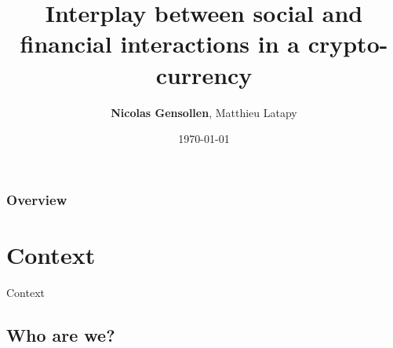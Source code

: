 \documentclass{beamer}
\title[social and financial interactions]{Interplay between social and financial interactions in a crypto-currency } %
\author{\textbf{Nicolas Gensollen}, Matthieu Latapy} %
\institute[LIP6] %
{
Laboratoire d'informatique de Paris 6 \\ %
\medskip
\textit{nicolas.gensollen@lip6.fr} %
}
\date{\today} %
\begin{document}
\begin{frame}
\titlepage %
\end{frame}

\begin{frame}
\frametitle{Overview} %
\tableofcontents %
\end{frame}



\section{Context} 

\begin{frame}
\Huge{\centerline{Context}}
\end{frame}


\subsection{Who are we?}
\end{document}
